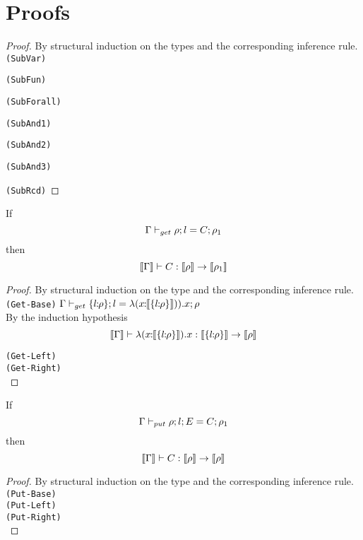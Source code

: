 \section{Proofs}

\begin{proof}
By structural induction on the types and the corresponding inference rule. \\

\texttt{(SubVar)}

\texttt{(SubFun)}

\texttt{(SubForall)}

\texttt{(SubAnd1)}

\texttt{(SubAnd2)}

\texttt{(SubAnd3)}

\texttt{(SubRcd)}

\end{proof}

\begin{lemma}
  If $$ \Gamma \vdash_{get} \rho ; l = C ; \rho_1 $$
  then $$ \llbracket {\Gamma} \rrbracket \vdash C : \llbracket {\rho} \rrbracket \to \llbracket {\rho_1} \rrbracket $$
\end{lemma}

\begin{proof}
By structural induction on the type and the corresponding inference rule. \\

\texttt{(Get-Base)} $ \Gamma \turnsget \recordtype l \ty ; l = \idmono {\image {\recordtype l \ty})} ; \ty $ \\

By the induction hypothesis
$$ \image \Gamma \turns \idmono {\image {\recordtype l \ty}} : \image {\recordtype l \ty} \to \image \ty $$

\texttt{(Get-Left)} \\
\texttt{(Get-Right)} \\

\end{proof}

\begin{lemma}
  If $$ \Gamma \vdash_{put} \rho ; l ; E = C ; \rho_1 $$
  then $$ \llbracket {\Gamma} \rrbracket \vdash C : \llbracket {\rho} \rrbracket \to \llbracket {\rho} \rrbracket $$
\end{lemma}

\begin{proof}
By structural induction on the type and the corresponding inference rule. \\

\texttt{(Put-Base)} \\
\texttt{(Put-Left)} \\
\texttt{(Put-Right)} \\
\end{proof}

